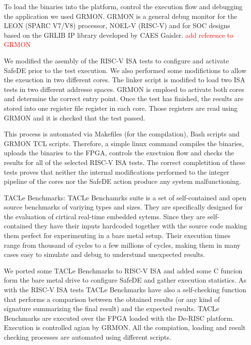 To load the binaries into the platform, control the execution flow and debugging the application we used GRMON. GRMON is a general debug monitor for the LEON (SPARC V7/V8) processor, NOEL-V (RISC-V) and for SOC designs based on the GRLIB IP library developed by CAES Gaisler. 
\textcolor{red}{add reference to GRMON} 

We modified the asembly of the RISC-V ISA tests to configure and activate SafeDE prior to the test execution. We also performed some modifictions to allow the exeuction in two different cores. The linker script is modified to load two ISA tests in two different addresse spaces. GRMON is emploed to activate both cores and determine the correct entry point. Once the test has finished, the results are stored into one register file register in each core. Those registers are read using GRMON and it is checked that the test passed. 

This process is automated via Makefiles (for the compilation), Bash scripts and GRMON TCL scripts. Therefore, a simple linux command compiles the binaries, uploads the binaries to the FPGA, controls the exectuion flow and checks the results for all of the selected RISC-V ISA tests. The correct completition of these tests proves that neither the internal modifications performed to the integer pipeline of the cores nor the SafeDE action produce any system malfunctioning.

TACLe Benchmarks:
TACLe Benchamrks suite is a set of self-contained and open source benchmarks of variying types and sizes. They are specifically designed for the evaluation of cirtical real-time embedded sytems. Since they are self-contained they have their inputs hardcoded together with the source code making them perfect for experimenting in a bare metal setup. Their execution times range from thousand of cycles to a few millions of cycles, making them in many cases easy to simulate and debug to understund unexpected results.

We ported some TACLe Benchmarks to RISC-V ISA and added some C funcion form the bare metal drive to configure SafeDE and gather execution statistics. As with the RISC-V ISA tests TACLe Benchmarks have also a self-checking function that performs a comparison between the obtained results (or any kind of signature summarizing the final result) and the expected results. TACLe Benchmarks are executed over the FPGA loaded with the De-RISC platform. Execution is controlled agian by GRMON. All the compiation, loading and result checking processes are automated using different scripts. 


